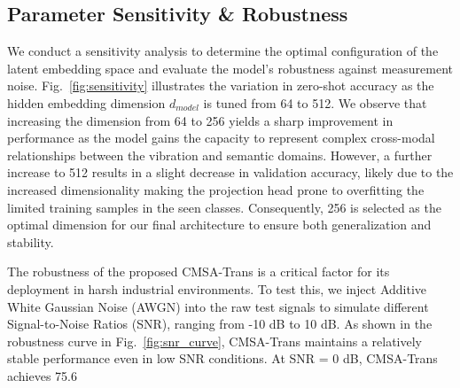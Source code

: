 \documentclass[journal]{IEEEtran}
\begin{document}
\subsection{Parameter Sensitivity \& Robustness}
We conduct a sensitivity analysis to determine the optimal configuration of the latent embedding space and evaluate the model's robustness against measurement noise. Fig.~\ref{fig:sensitivity} illustrates the variation in zero-shot accuracy as the hidden embedding dimension $d_{model}$ is tuned from 64 to 512. We observe that increasing the dimension from 64 to 256 yields a sharp improvement in performance as the model gains the capacity to represent complex cross-modal relationships between the vibration and semantic domains. However, a further increase to 512 results in a slight decrease in validation accuracy, likely due to the increased dimensionality making the projection head prone to overfitting the limited training samples in the seen classes. Consequently, 256 is selected as the optimal dimension for our final architecture to ensure both generalization and stability.

The robustness of the proposed CMSA-Trans is a critical factor for its deployment in harsh industrial environments. To test this, we inject Additive White Gaussian Noise (AWGN) into the raw test signals to simulate different Signal-to-Noise Ratios (SNR), ranging from -10 dB to 10 dB. As shown in the robustness curve in Fig.~\ref{fig:snr_curve}, CMSA-Trans maintains a relatively stable performance even in low SNR conditions. At SNR = 0 dB, CMSA-Trans achieves 75.6%
\end{document}
